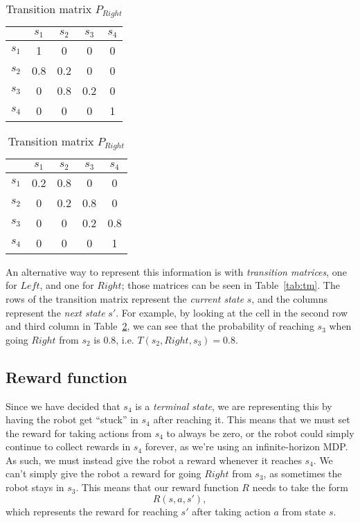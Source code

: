 \documentclass[a4paper]{article}
\begin{document}
\begin{table}[h!]
  \caption{
    Transition matrix representation of $\transFunc$.
  }
  \label{tab:tm}
  \begin{subtable}{.5\linewidth}
    \centering
    \caption{Transition matrix $P_{Left}$}
    \label{tab:tm_left}
    \begin{tabular}{c|cccc}
            &$s_1$&$s_2$&$s_3$&$s_4$\\
      \hline
      $s_1$ & 1   & 0   & 0   & 0   \\
      $s_2$ & 0.8 & 0.2 & 0   & 0   \\
      $s_3$ & 0   & 0.8 & 0.2 & 0   \\
      $s_4$ & 0   & 0   & 0   & 1 \\
    \end{tabular}
  \end{subtable}
  \begin{subtable}{.5\linewidth}
    \centering
    \caption{Transition matrix $P_{Right}$}
    \label{tab:tm_right}
    \begin{tabular}{c|cccc}
            &$s_1$&$s_2$&$s_3$&$s_4$\\
      \hline
      $s_1$ & 0.2 & 0.8 & 0   & 0   \\
      $s_2$ & 0   & 0.2 & 0.8 & 0   \\
      $s_3$ & 0   & 0   & 0.2 & 0.8 \\
      $s_4$ & 0   & 0   & 0   & 1 \\
    \end{tabular}
  \end{subtable}
\end{table}

An alternative way to represent this information is with
\emph{transition matrices}, one for $Left$, and one for $Right$;
those matrices can be seen in Table~\ref{tab:tm}.
The rows of the transition matrix represent the \emph{current state} $s$,
and the columns represent the \emph{next state} $s'$.
For example, by looking at the cell in the second row and third column in
Table~\ref{tab:tm_right}, we can see that the probability of reaching
$s_3$ when going $Right$ from $s_2$ is 0.8,
i.e. $T(s_2, Right, s_3) = 0.8$.

\subsection{Reward function}
Since we have decided that $s_4$ is a \emph{terminal state}, we are
representing this by having the robot get ``stuck'' in $s_4$ after reaching
it.
This means that we must set the reward for taking actions from $s_4$ to
always be zero, or the robot could simply continue to collect rewards in
$s_4$ forever, as we're using an infinite-horizon MDP.
As such, we must instead give the robot a reward whenever it reaches
$s_4$.
We can't simply give the robot a reward for going $Right$ from $s_3$, as
sometimes the robot stays in $s_3$.
This means that our reward function $R$ needs to take the form
$$R(s, a, s') , $$
which represents the reward for reaching $s'$ after taking action $a$
from state $s$.
\end{document}
